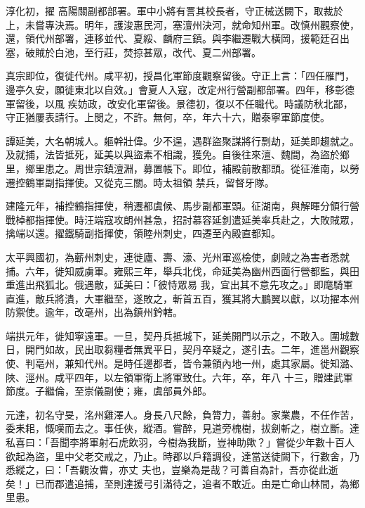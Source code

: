 \begin{pinyinscope}
 淳化初，擢
 高陽關副都部署。軍中小將有詈其校長者，守正械送闕下，取裁於上，未嘗專決焉。明年，護浚惠民河，塞澶州決河，就命知州軍。改慎州觀察使，還，領代州部署，連移並代、夏綏、麟府三鎮。與李繼遷戰大橫岡，援範廷召出塞，破賊於白池，至行莊，焚掠甚眾，改代、夏二州部署。



 真宗即位，復徙代州。咸平初，授昌化軍節度觀察留後。守正上言：「四任雁門，邊亭久安，願徙東北以自效。」會夏人入寇，改定州行營副都部署。四年，移彰德軍留後，以風
 疾妨政，改安化軍留後。景德初，復以不任職代。時議防秋北鄙，守正猶屢表請行。上閔之，不許。無何，卒，年六十六，贈泰寧軍節度使。



 譚延美，大名朝城人。軀幹壯偉。少不逞，遇群盜聚謀將行剽劫，延美即趨就之。及就捕，法皆抵死，延美以與盜素不相識，獲免。自後往來澶、魏間，為盜於鄉里，鄉里患之。周世宗鎮澶淵，募置帳下。即位，補殿前散都頭。從征淮南，以勞遷控鶴軍副指揮使。又從克三關。時太祖領
 禁兵，留督牙隊。



 建隆元年，補控鶴指揮使，稍遷都虞候、馬步副都軍頭。征湖南，與解暉分領行營戰棹都指揮使。時汪端寇攻朗州甚急，招討慕容延釗遣延美率兵赴之，大敗賊眾，擒端以還。擢鐵騎副指揮使，領睦州刺史，四遷至內殿直都知。



 太平興國初，為蘄州刺史，連徙廬、壽、濠、光州軍巡檢使，劇賊之為害者悉就捕。六年，徙知威虜軍。雍熙三年，舉兵北伐，命延美為幽州西面行營都監，與田重進出飛狐北。俄遇敵，延美曰：「彼恃眾易
 我，宜出其不意先攻之。」即麾騎軍直進，敵兵將潰，大軍繼至，遂敗之，斬首五百，獲其將大鵬翼以獻，以功擢本州防禦使。逾年，改亳州，出為鎮州鈐轄。



 端拱元年，徙知寧遠軍。一旦，契丹兵抵城下，延美開門以示之，不敢入。圍城數日，開門如故，民出取芻糧者無異平日，契丹卒疑之，遂引去。二年，進邕州觀察使、判亳州，兼知代州。是時任邊郡者，皆令兼領內地一州，處其家屬。徙知潞、陜、涇州。咸平四年，以左領軍衛上將軍致仕。六年，卒，年八
 十三，贈建武軍節度。子繼倫，至崇儀副使；雍，虞部員外郎。



 元達，初名守旻，洺州雞澤人。身長八尺餘，負膂力，善射。家業農，不任作苦，委耒耜，慨嘆而去之。事任俠，縱酒。嘗醉，見道旁槐樹，拔劍斬之，樹立斷。達私喜曰：「吾聞李將軍射石虎飲羽，今樹為我斷，豈神助歟？」嘗從少年數十百人欲起為盜，里中父老交戒之，乃止。時郡以戶籍調役，達當送徒闕下，行數舍，乃悉縱之，曰：「吾觀汝曹，亦丈
 夫也，豈樂為是哉？可善自為計，吾亦從此逝矣！」已而郡遣追捕，至則達援弓引滿待之，追者不敢近。由是亡命山林間，為鄉里患。




\end{pinyinscope}
